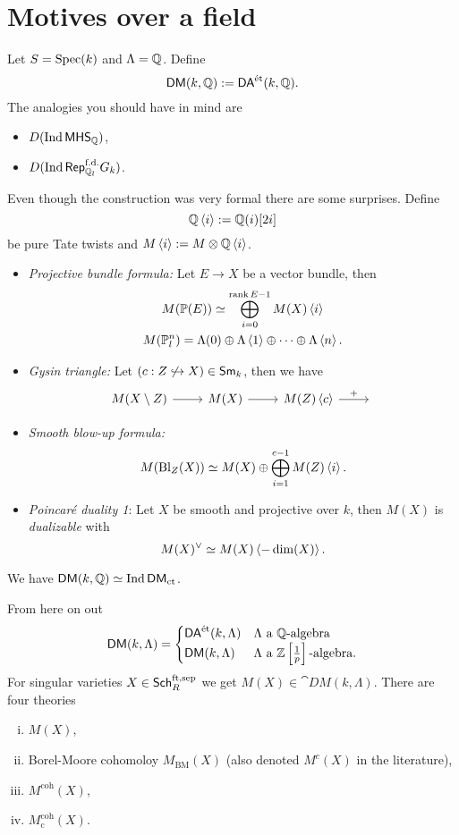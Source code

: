 \section{Motives over a field}
Let $S=\operatorname{Spec}(k)$ and $\Lambda=\mathbb Q$. Define
\[
	\mathsf{DM}(k,\mathbb Q) := \mathsf{DA}^\text{\'et}(k,\mathbb Q).
\] 
The analogies you should have in mind are
\begin{itemize}
	\item $D(\operatorname{Ind} \mathsf{MHS}_{\mathbb Q})$,
	\item $D(\operatorname{Ind} \mathsf{Rep}_{\mathbb Q_l}^{\text{f.d.}}G_k)$.
\end{itemize}
Even though the construction was very formal there are some surprises. Define
\[
	\mathbb Q\left<i \right> := \mathbb Q(i)[2i]
\] 
be pure Tate twists and $M\left<i \right>:= M\otimes \mathbb Q\left<i \right>$.
\begin{itemize}
	\item \emph{Projective bundle formula:} Let $E\to X$ be a vector bundle, then
		\begin{gather*}
			M(\mathbb{P}(E)) \simeq \bigoplus_{i=0}^{\operatorname{rank} E-1}M(X)\left<i \right> \\
			M(\mathbb{P}^{n}_l) = \Lambda(0)\oplus \Lambda\left<1 \right>\oplus \dots\oplus \Lambda\left<n \right>.
		\end{gather*}
	\item \emph{Gysin triangle:} Let $(c:Z\not\hookrightarrow X)\in \mathsf{Sm}_k$, then we have
		\[
		\begin{tikzcd}
			M(X\setminus Z) \ar[r] & M(X) \ar[r] & M(Z)\left<c \right> \ar[r,"+"] & { }
		\end{tikzcd}
		\] 
	\item \emph{Smooth blow-up formula:}
		\[
		M(\operatorname{Bl}_Z(X)) \simeq M(X)\oplus \bigoplus_{i=1}^{c-1}M(Z)\left<i \right>.
		\] 
	\item \emph{Poincar\'e duality 1}: Let $X$ be smooth and projective over $k$, then $M(X)$ is \emph{dualizable} with
		\[
		M(X)^{\vee}\simeq M(X)\left<-\dim(X) \right>.
		\] 
\end{itemize}
We have $\mathsf{DM}(k,\mathbb Q)\simeq \operatorname{Ind}\mathsf{DM}_{\text{ct}}$.

From here on out
\[
	\mathsf{DM}(k,\Lambda) = \begin{cases}
		\mathsf{DA}^\text{\'et}(k,\Lambda) & \Lambda\text{ a }\mathbb Q\text{-algebra} \\
		\mathsf{DM}(k,\Lambda) & \Lambda\text{ a }\mathbb Z\left[ \frac{1}{p} \right] \text{-algebra}.
	\end{cases}
\] 
For singular varieties $X\in \mathsf{Sch}_R^{\text{ft,sep}}$ we get $M(X)\in \cat{DM}(k,\Lambda)$. There are four theories
\begin{enumerate}[(i)]
	\item $M(X)$,
	\item Borel-Moore cohomoloy $M_{\mathrm{BM}}(X)$ (also denoted $M^{c}(X)$ in the literature),
	\item $M^{\text{coh}}(X)$,
	\item $M_{\text{c}}^{\text{coh}}(X)$.
\end{enumerate}

